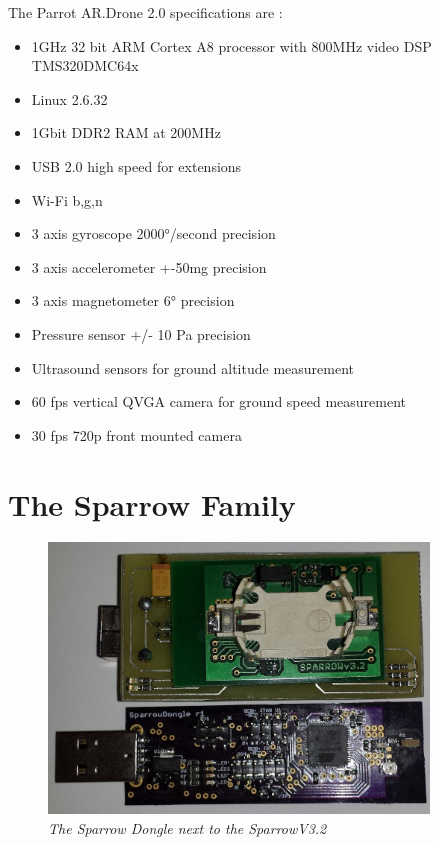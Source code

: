  

The Parrot AR.Drone 2.0 specifications are :
\begin{itemize}



\item   1GHz 32 bit ARM Cortex A8 processor with 800MHz video DSP TMS320DMC64x
\item   Linux 2.6.32
\item   1Gbit DDR2 RAM at 200MHz
\item   USB 2.0 high speed for extensions
\item   Wi-Fi b,g,n
\item   3 axis gyroscope 2000°/second precision
\item   3 axis accelerometer +-50mg precision
\item   3 axis magnetometer 6° precision
\item   Pressure sensor +/- 10 Pa precision
\item   Ultrasound sensors for ground altitude measurement
\item   60 fps vertical QVGA camera for ground speed measurement
\item	30 fps 720p front mounted camera 	

\end{itemize}


\section{The Sparrow Family}

\begin{figure}[ht]
\begin{center}
\includegraphics[width=0.9\textwidth]{img/sparrow.jpg}
\end{center}
\caption{\small \itshape{The Sparrow Dongle next to the SparrowV3.2}}
\end{figure}
 
